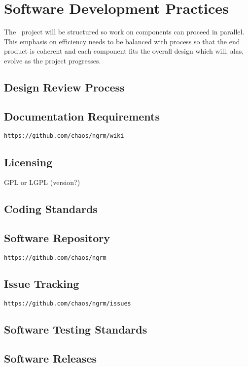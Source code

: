 \section{Software Development Practices}
\label{sect:process}

The \ngrm\ project will be structured so work on components
can proceed in parallel.  This emphasis on efficiency needs to be
balanced with process so that the end product is coherent and each
component fits the overall design which will, alas, evolve as the
project progresses.

\subsection{Design Review Process}

\subsection{Documentation Requirements}
{\tt https://github.com/chaos/ngrm/wiki}

\subsection{Licensing}
GPL or LGPL (version?)

\subsection{Coding Standards}

\subsection{Software Repository}
{\tt https://github.com/chaos/ngrm}

\subsection{Issue Tracking}
{\tt https://github.com/chaos/ngrm/issues}

\subsection{Software Testing Standards}

\subsection{Software Releases}
